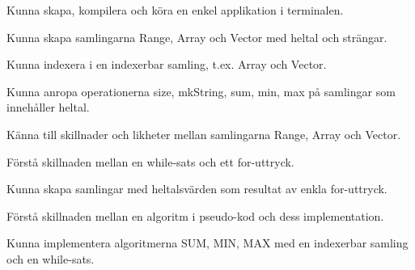 
\item Kunna skapa, kompilera och köra en enkel applikation i terminalen.
\item Kunna skapa samlingarna Range, Array och Vector med heltal och strängar.
\item Kunna indexera i en indexerbar samling, t.ex. Array och Vector.
\item Kunna anropa operationerna size, mkString, sum, min, max på samlingar som innehåller heltal.
\item Känna till skillnader och likheter mellan samlingarna Range, Array och Vector.
\item Förstå skillnaden mellan en while-sats och ett for-uttryck.
\item Kunna skapa samlingar med heltalsvärden som resultat av enkla for-uttryck.
\item Förstå skillnaden mellan en algoritm i pseudo-kod och dess implementation.
\item Kunna implementera algoritmerna SUM, MIN, MAX med en indexerbar samling och en while-sats.

